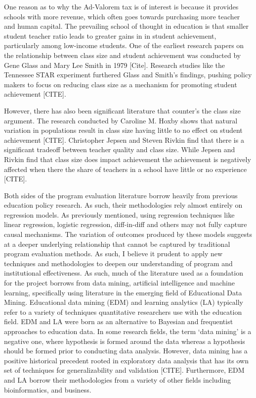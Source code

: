 \documentclass[]{article}
\begin{document}
One reason as to why the Ad-Valorem tax is of interest is because it provides schools with more revenue, which often goes towards purchasing more teacher and human capital. The prevailing school of thought in education is that smaller student teacher ratio leads to greater gains in in student achievement, particularly among low-income students. One of the earliest research papers on the relationship between class size and student achievement was conducted by Gene Glass and Mary Lee Smith in 1979 [Cite]. Research studies like the Tennessee STAR experiment furthered Glass and Smith’s findings, pushing policy makers to focus on reducing class size as a mechanism for promoting student achievement [CITE]. 

However, there has also been significant literature that counter’s the class size argument. The research conducted by Caroline M. Hoxby shows that natural variation in populations result in class size having little to no effect on student achievement [CITE]. Christopher Jepsen and Steven Rivkin find that there is a significant tradeoff between teacher quality and class size. While Jepsen and Rivkin find that class size does impact achievement the achievement is negatively affected when there the share of teachers in a school have little or no experience [CITE]. 

Both sides of the program evaluation literature borrow heavily from previous education policy research. As such, their methodologies rely almost entirely on regression models. As previously mentioned, using regression techniques like linear regression, logistic regression, diff-in-diff and others may not fully capture causal mechanisms. The variation of outcomes produced by these models suggests at a deeper underlying relationship that cannot be captured by traditional program evaluation methods. As such, I believe it prudent to apply new techniques and methodologies to deepen our understanding of program and institutional effectiveness. As such, much of the literature used as a foundation for the project borrows from data mining, artificial intelligence and machine learning, specifically using literature in the emerging field of Educational Data Mining.
Educational data mining (EDM) and learning analytics (LA) typically refer to a variety of techniques quantitative researchers use with the education field. EDM and LA were born as an alternative to Bayesian and frequentist approaches to education data. In some research fields, the term ‘data mining’ is a negative one, where hypothesis is formed around the data whereas a hypothesis should be formed prior to conducting data analysis. However, data mining has a positive historical precedent rooted in exploratory data analysis that has its own set of techniques for generalizability and validation [CITE]. Furthermore, EDM and LA borrow their methodologies from a variety of other fields including bioinformatics, and business.
\end{document}
